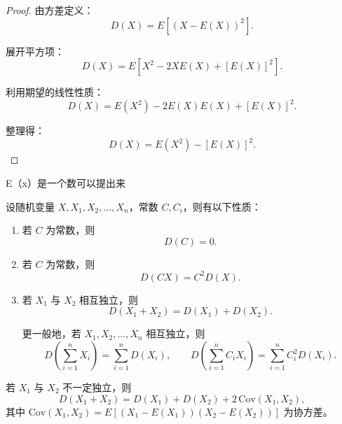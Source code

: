 \begin{proof}
由方差定义：
\[
D(X) = E\!\left[(X - E(X))^2\right].
\]

展开平方项：
\[
D(X) = E\!\left[X^2 - 2X E(X) + [E(X)]^2\right].
\]

利用期望的线性性质：
\[
D(X) = E(X^2) - 2E(X)E(X) + [E(X)]^2.
\]

整理得：
\[
\boxed{D(X) = E(X^2) - [E(X)]^2.}
\]
\end{proof}
\begin{note}
    E（x）是一个数可以提出来
\end{note}
\begin{theorem}[方差的性质]
设随机变量 $X, X_1, X_2, \ldots, X_n$，常数 $C, C_i$，则有以下性质：

\begin{enumerate}
  \item 若 $C$ 为常数，则
  \[
  D(C)=0.
  \]
  
  \item 若 $C$ 为常数，则
  \[
  D(CX)=C^2 D(X).
  \]
  
  \item 若 $X_1$ 与 $X_2$ 相互独立，则
  \[
  D(X_1+X_2)=D(X_1)+D(X_2).
  \]
  
  更一般地，若 $X_1, X_2, \ldots, X_n$ 相互独立，则
  \[
  D\!\left(\sum_{i=1}^n X_i\right)
  = \sum_{i=1}^n D(X_i),
  \qquad
  D\!\left(\sum_{i=1}^n C_i X_i\right)
  = \sum_{i=1}^n C_i^2 D(X_i).
  \]
\end{enumerate}
\end{theorem}

\begin{note}
若 $X_1$ 与 $X_2$ 不一定独立，则
\[
D(X_1+X_2) = D(X_1) + D(X_2) + 2\,\mathrm{Cov}(X_1,X_2),
\]
其中 $\mathrm{Cov}(X_1,X_2)=E[(X_1-E(X_1))(X_2-E(X_2))]$ 为协方差。
\end{note}



